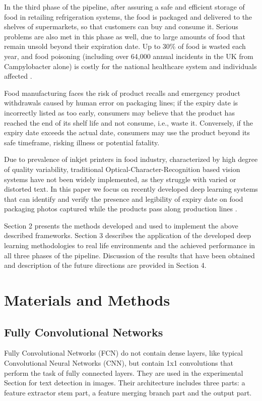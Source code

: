 \documentclass[journal,article,accept,moreauthors,pdftex]{Definitions/mdpi}
\begin{document}
In the third phase of the pipeline, after assuring a safe and efficient storage of food in retailing refrigeration systems, the food is packaged and delivered to the shelves of  supermarkets, so that customers can buy and consume it. Serious problems are also met in this phase as well, due to large amounts of food that remain unsold beyond their expiration date. Up to 30\% of food is wasted each year, and food poisoning (including over 64,000 annual incidents in the UK from Campylobacter alone) is costly for the national healthcare system and individuals affected \cite{ref75}. 

Food manufacturing faces the risk of product recalls and emergency product withdrawals  caused by human error on packaging lines; if the expiry date is incorrectly listed as too early, consumers may believe that the product has reached the end of its shelf life and not consume, i.e., waste it. Conversely, if the expiry date exceeds the actual date, consumers may use the product beyond its safe timeframe, risking illness or potential fatality. 

Due to prevalence of inkjet printers in food industry, characterized by high degree of quality variability, traditional Optical-Character-Recognition based vision systems have not been widely implemented, as they struggle with varied or distorted text. In this paper we focus on recently developed deep learning systems that can identify and verify the presence and legibility of expiry date on food packaging photos captured while the products pass along production lines \cite{ref109, ref110}.

Section 2 presents the methods developed and used to implement the above described frameworks. Section 3 describes the application of the developed deep learning methodologies to real life environments and the achieved performance in all three phases of the pipeline. Discussion of the results that have been obtained and description of the future directions are provided in Section 4.  
\section{Materials and Methods}

\subsection{Fully Convolutional Networks} 

Fully Convolutional Networks (FCN) \cite{ref80} do not contain dense layers, like typical Convolutional Neural Networks (CNN), but contain 1x1 convolutions that perform the task of fully connected layers. They are used in the experimental Section for text detection in images. Their architecture includes three parts: a feature
extractor stem part, a feature merging branch part and the output
part.
\end{document}
